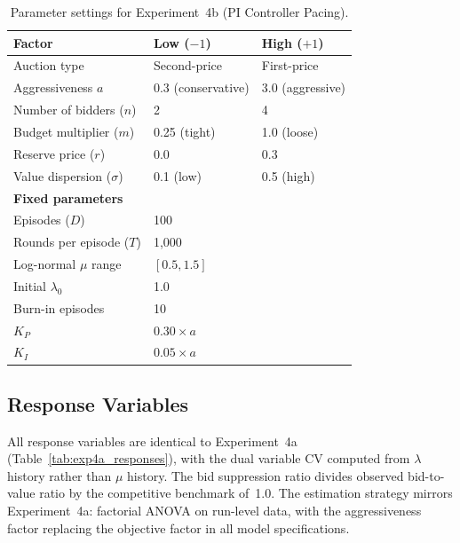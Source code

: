 \begin{table}[H]
\centering
\caption{Parameter settings for Experiment~4b (PI Controller Pacing).}
\label{tab:exp4bparams}
\begin{tabular}{l l l}
\toprule
\textbf{Factor} & \textbf{Low ($-1$)} & \textbf{High ($+1$)}\\
\midrule
Auction type & Second-price & First-price \\
Aggressiveness $a$ & 0.3 (conservative) & 3.0 (aggressive) \\
Number of bidders ($n$) & 2 & 4 \\
Budget multiplier ($m$) & 0.25 (tight) & 1.0 (loose) \\
Reserve price ($r$) & 0.0 & 0.3 \\
Value dispersion ($\sigma$) & 0.1 (low) & 0.5 (high) \\
\midrule
\multicolumn{3}{l}{\textbf{Fixed parameters}} \\
\midrule
Episodes ($D$) & \multicolumn{2}{l}{100} \\
Rounds per episode ($T$) & \multicolumn{2}{l}{1{,}000} \\
Log-normal $\mu$ range & \multicolumn{2}{l}{$[0.5, 1.5]$} \\
Initial $\lambda_0$ & \multicolumn{2}{l}{1.0} \\
Burn-in episodes & \multicolumn{2}{l}{10} \\
$K_P$ & \multicolumn{2}{l}{$0.30 \times a$} \\
$K_I$ & \multicolumn{2}{l}{$0.05 \times a$} \\
\bottomrule
\end{tabular}
\end{table}

\subsection{Response Variables}

All response variables are identical to Experiment~4a (Table~\ref{tab:exp4a_responses}), with the dual variable CV computed from $\lambda$ history rather than $\mu$ history. The bid suppression ratio divides observed bid-to-value ratio by the competitive benchmark of~1.0. The estimation strategy mirrors Experiment~4a: factorial ANOVA on run-level data, with the aggressiveness factor replacing the objective factor in all model specifications.
